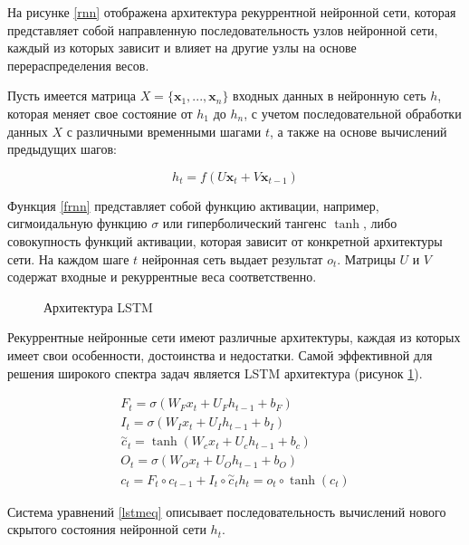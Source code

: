 На рисунке \ref{rnn} отображена архитектура рекуррентной нейронной сети,
которая представляет собой направленную последовательность
узлов нейронной сети, каждый из которых
зависит и влияет на другие узлы на основе
перераспределения весов.

Пусть имеется матрица $X = \{\textbf{x}_1, ..., \textbf{x}_n \}$ входных данных
в нейронную сеть $h$, которая меняет свое состояние от $h_1$ до $h_n$,
с учетом последовательной обработки данных $X$ с различными временными шагами $t$,
а также на основе вычислений предыдущих шагов:

\begin{equation} \label{frnn}
    h_t = f(U\textbf{x}_t + V\textbf{x}_{t-1})
\end{equation}

Функция \ref{frnn} представляет собой функцию активации,
например, сигмоидальную функцию $\sigma$ или гиперболический тангенс $\tanh$,
либо совокупность функций активации,
которая зависит от конкретной архитектуры сети.
На каждом шаге $t$ нейронная сеть выдает результат $o_t$.
Матрицы $U$ и $V$ содержат входные и рекуррентные веса соответственно.

\begin{figure}[H]
    \caption{Архитектура LSTM}
    \label{lstm}
\end{figure}

Рекуррентные нейронные сети
имеют различные архитектуры, каждая из которых имеет свои особенности,
достоинства и недостатки.
Самой эффективной для решения широкого спектра задач
является LSTM архитектура (рисунок \ref{lstm}).


\begin{equation} \label{lstmeq}
    \begin{gathered}
    F_t = \sigma(W_F x_t + U_F h_{t-1} + b_F) \\
    I_t = \sigma(W_I x_t + U_I h_{t-1} + b_I) \\
    \stackrel{\sim}{c}_t = \tanh(W_c x_t + U_c h_{t-1} + b_c) \\
    O_t = \sigma(W_O x_t + U_O h_{t-1} + b_O) \\
    c_t = F_t \circ c_{t-1} +  I_t \circ \stackrel{\sim}{c}_t
    h_t = o_t \circ \tanh(c_t)
    \end{gathered}
\end{equation}

Система уравнений \ref{lstmeq} описывает последовательность
вычислений нового скрытого состояния нейронной сети $h_t$.

